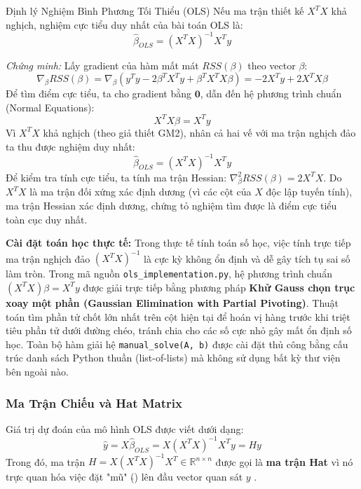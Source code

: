 \documentclass[12pt,a4paper]{article}
\begin{document}
\begin{theorembox}{Định lý Nghiệm Bình Phương Tối Thiểu (OLS)}
Nếu ma trận thiết kế $X^T X$ khả nghịch, nghiệm cực tiểu duy nhất của bài toán OLS là:
\begin{equation}
    \hat{\beta}_{OLS} = (X^T X)^{-1} X^T y
\end{equation}
\end{theorembox}

\noindent\textit{Chứng minh:}
Lấy gradient của hàm mất mát $RSS(\beta)$ theo vector $\beta$:
\begin{equation}
    \nabla_{\beta} RSS(\beta) = \nabla_{\beta} (y^T y - 2\beta^T X^T y + \beta^T X^T X \beta) = -2X^T y + 2X^T X \beta
\end{equation}
Để tìm điểm cực tiểu, ta cho gradient bằng $\mathbf{0}$, dẫn đến hệ phương trình chuẩn (Normal Equations):
\begin{equation}
    X^T X \beta = X^T y
\end{equation}
Vì $X^T X$ khả nghịch (theo giả thiết GM2), nhân cả hai vế với ma trận nghịch đảo ta thu được nghiệm duy nhất:
\begin{equation}
    \hat{\beta}_{OLS} = (X^T X)^{-1} X^T y
\end{equation}
Để kiểm tra tính cực tiểu, ta tính ma trận Hessian: $\nabla^2_{\beta} RSS(\beta) = 2X^T X$. Do $X^T X$ là ma trận đối xứng xác định dương (vì các cột của $X$ độc lập tuyến tính), ma trận Hessian xác định dương, chứng tỏ nghiệm tìm được là điểm cực tiểu toàn cục duy nhất.

\noindent\textbf{Cài đặt toán học thực tế:}
Trong thực tế tính toán số học, việc tính trực tiếp ma trận nghịch đảo $(X^T X)^{-1}$ là cực kỳ không ổn định và dễ gây tích tụ sai số làm tròn. Trong mã nguồn \texttt{ols\_implementation.py}, hệ phương trình chuẩn $(X^T X) \beta = X^T y$ được giải trực tiếp bằng phương pháp \textbf{Khử Gauss chọn trục xoay một phần (Gaussian Elimination with Partial Pivoting)}. Thuật toán tìm phần tử chốt lớn nhất trên cột hiện tại để hoán vị hàng trước khi triệt tiêu phần tử dưới đường chéo, tránh chia cho các số cực nhỏ gây mất ổn định số học. Toàn bộ hàm giải hệ \texttt{manual\_solve(A, b)} được cài đặt thủ công bằng cấu trúc danh sách Python thuần (list-of-lists) mà không sử dụng bất kỳ thư viện bên ngoài nào.

\subsubsection{Ma Trận Chiếu và Hat Matrix}
Giá trị dự đoán của mô hình OLS được viết dưới dạng:
\begin{equation}
    \hat{y} = X\hat{\beta}_{OLS} = X(X^T X)^{-1} X^T y = H y
\end{equation}
Trong đó, ma trận $H = X(X^T X)^{-1} X^T \in \mathbb{R}^{n \times n}$ được gọi là \textbf{ma trận Hat} vì nó trực quan hóa việc đặt "mũ" ($\hat{}$) lên đầu vector quan sát $y$ \cite{strang}.
\end{document}
